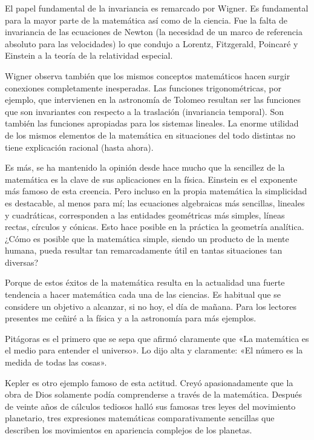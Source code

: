 \documentclass[a4paper, 12pt]{article}
\begin{document}
El papel fundamental de la invariancia es remarcado por Wigner. Es fundamental para la mayor parte de la matemática así como de la ciencia. Fue la falta de invariancia de las ecuaciones de Newton (la necesidad de un marco de referencia absoluto para las velocidades) lo que condujo a Lorentz, Fitzgerald, Poincaré y Einstein a la teoría de la relatividad especial.

 

Wigner observa también que los mismos conceptos matemáticos hacen surgir conexiones completamente inesperadas. Las funciones trigonomé\-tricas, por ejemplo, que intervienen en la astronomía de Tolomeo resultan ser las funciones que son invariantes con respecto a la traslación (invariancia temporal). Son también las funciones apropiadas para los sistemas lineales. La enorme utilidad de los mismos elementos de la matemática en situaciones del todo distintas no tiene explicación racional (hasta ahora).

 

Es más, se ha mantenido la opinión desde hace mucho que la sencillez de la matemática es la clave de sus aplicaciones en la física. Einstein es el exponente más famoso de esta creencia. Pero incluso en la propia matemática la simplicidad es destacable, al menos para mí; las ecuaciones algebraicas más sencillas, lineales y cuadráticas, corresponden a las entidades geométricas más simples, líneas rectas, círculos y cónicas. Esto hace posible en la práctica la geometría analítica. ¿Cómo es posible que la matemática simple, siendo un producto de la mente humana, pueda resultar tan remarcadamente útil en tantas situaciones tan diversas?

 

Porque de estos éxitos de la matemática resulta en la actualidad una fuerte tendencia a hacer matemática cada una de las ciencias. Es habitual que se considere un objetivo a alcanzar, si no hoy, el día de mañana. Para los lectores presentes me ceñiré a la física y a la astronomía para más ejemplos.

 

Pitágoras es el primero que se sepa que afirmó claramente que «La matemática es el medio para entender el universo». Lo  dijo alta y claramente: «El número es la medida de todas las cosas».

 

Kepler es otro ejemplo famoso de esta actitud. Creyó apasionadamente que la obra de Dios solamente podía comprenderse a través de la matemática. Después de veinte años de cálculos tediosos halló sus famosas tres leyes del movimiento planetario, tres expresiones matemáticas comparativamente sencillas que describen los movimientos en apariencia complejos de los planetas.
\end{document}

